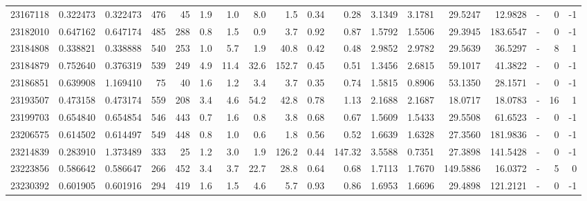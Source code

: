 \begin{tabular}{rrrrrrrrrrrrrrrlrr}
  23167118 & 0.322473 &   0.322473 &  476 &   45 &      1.9 &      1.0 &     8.0 &      1.5 &       0.34 &        0.28 &  3.1349 &  3.1781 &   29.5247 &   12.9828 &             - &        0 &         -1 \\
  23182010 & 0.647162 &   0.647174 &  485 &  288 &      0.8 &      1.5 &     0.9 &      3.7 &       0.92 &        0.87 &  1.5792 &  1.5506 &   29.3945 &  183.6547 &             - &        0 &         -1 \\
  23184808 & 0.338821 &   0.338888 &  540 &  253 &      1.0 &      5.7 &     1.9 &     40.8 &       0.42 &        0.48 &  2.9852 &  2.9782 &   29.5639 &   36.5297 &             - &        8 &          1 \\
  23184879 & 0.752640 &   0.376319 &  539 &  249 &      4.9 &     11.4 &    32.6 &    152.7 &       0.45 &        0.51 &  1.3456 &  2.6815 &   59.1017 &   41.3822 &             - &        0 &         -1 \\
  23186851 & 0.639908 &   1.169410 &   75 &   40 &      1.6 &      1.2 &     3.4 &      3.7 &       0.35 &        0.74 &  1.5815 &  0.8906 &   53.1350 &   28.1571 &             - &        0 &         -1 \\
  23193507 & 0.473158 &   0.473174 &  559 &  208 &      3.4 &      4.6 &    54.2 &     42.8 &       0.78 &        1.13 &  2.1688 &  2.1687 &   18.0717 &   18.0783 &             - &       16 &          1 \\
  23199703 & 0.654840 &   0.654854 &  546 &  443 &      0.7 &      1.6 &     0.8 &      3.8 &       0.68 &        0.67 &  1.5609 &  1.5433 &   29.5508 &   61.6523 &             - &        0 &         -1 \\
  23206575 & 0.614502 &   0.614497 &  549 &  448 &      0.8 &      1.0 &     0.6 &      1.8 &       0.56 &        0.52 &  1.6639 &  1.6328 &   27.3560 &  181.9836 &             - &        0 &         -1 \\
  23214839 & 0.283910 &   1.373489 &  333 &   25 &      1.2 &      3.0 &     1.9 &    126.2 &       0.44 &      147.32 &  3.5588 &  0.7351 &   27.3898 &  141.5428 &             - &        0 &         -1 \\
  23223856 & 0.586642 &   0.586647 &  266 &  452 &      3.4 &      3.7 &    22.7 &     28.8 &       0.64 &        0.68 &  1.7113 &  1.7670 &  149.5886 &   16.0372 &             - &        5 &          0 \\
  23230392 & 0.601905 &   0.601916 &  294 &  419 &      1.6 &      1.5 &     4.6 &      5.7 &       0.93 &        0.86 &  1.6953 &  1.6696 &   29.4898 &  121.2121 &             - &        0 &         -1 \\

\end{tabular}
